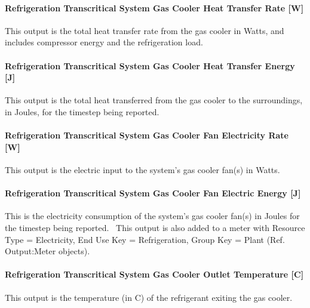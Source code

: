 \paragraph{Refrigeration Transcritical System Gas Cooler Heat Transfer Rate {[}W{]}}\label{refrigeration-transcritical-system-gas-cooler-heat-transfer-rate-w}

This output is the total heat transfer rate from the gas cooler in Watts, and includes compressor energy and the refrigeration load.

\paragraph{Refrigeration Transcritical System Gas Cooler Heat Transfer Energy {[}J{]}}\label{refrigeration-transcritical-system-gas-cooler-heat-transfer-energy-j}

This output is the total heat transferred from the gas cooler to the surroundings, in Joules, for the timestep being reported.

\paragraph{Refrigeration Transcritical System Gas Cooler Fan Electricity Rate {[}W{]}}\label{refrigeration-transcritical-system-gas-cooler-fan-electric-power-w}

This output is the electric input to the system's gas cooler fan(s) in Watts.

\paragraph{Refrigeration Transcritical System Gas Cooler Fan Electric Energy {[}J{]}}\label{refrigeration-transcritical-system-gas-cooler-fan-electric-energy-j}

This is the electricity consumption of the system's gas cooler fan(s) in Joules for the timestep being reported.~ This output is also added to a meter with Resource Type = Electricity, End Use Key = Refrigeration, Group Key = Plant (Ref. Output:Meter objects).

\paragraph{Refrigeration Transcritical System Gas Cooler Outlet Temperature {[}C{]}}\label{refrigeration-transcritical-system-gas-cooler-outlet-temperature-c}

This output is the temperature (in C) of the refrigerant exiting the gas cooler.


